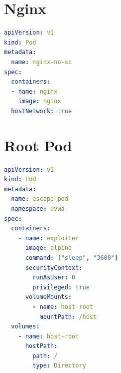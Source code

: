 \section{Nginx}
\begin{lstlisting}[language=yaml, caption={nginx.yaml}, label={lst:nginx}]
apiVersion: v1
kind: Pod
metadata:
  name: nginx-no-sc
spec:
  containers:
  - name: nginx
    image: nginx
  hostNetwork: true
\end{lstlisting}
\section{Root Pod}
\begin{lstlisting}[language=yaml, caption={root-pod.yaml}, label={lst:root-pod}]
apiVersion: v1
kind: Pod
metadata:
  name: escape-pod
  namespace: dvwa
spec:
  containers:
    - name: exploiter
      image: alpine
      command: ["sleep", "3600"]
      securityContext:
        runAsUser: 0
        privileged: true
      volumeMounts:
        - name: host-root
          mountPath: /host
  volumes:
    - name: host-root
      hostPath:
        path: /
        type: Directory

\end{lstlisting}




